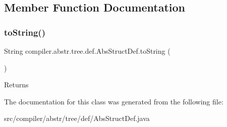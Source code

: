 \subsection{Member Function Documentation}
\mbox{\label{classcompiler_1_1abstr_1_1tree_1_1def_1_1_abs_struct_def_af141875c00e403614ea7ad9245fef7fc}} 
\subsubsection{\texorpdfstring{to\+String()}{toString()}}
{\footnotesize\ttfamily String compiler.\+abstr.\+tree.\+def.\+Abs\+Struct\+Def.\+to\+String (\begin{DoxyParamCaption}{ }\end{DoxyParamCaption})}

\begin{DoxyReturn}{Returns}

\end{DoxyReturn}


The documentation for this class was generated from the following file\+:\begin{DoxyCompactItemize}
\item 
src/compiler/abstr/tree/def/Abs\+Struct\+Def.\+java\end{DoxyCompactItemize}
